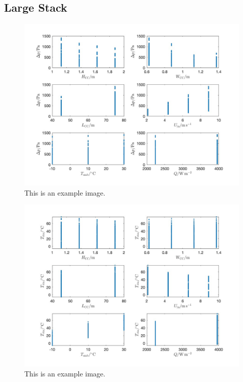     \subsection{Large Stack}
        \begin{figure}[H]
            \centering
            \includegraphics[width=1\textwidth]{00_Images/00_Large_Stack_Images/00_Pressure_Drop_vs_Features_July_10_2024_v1.jpg}  %
            \caption{This is an example image.}
            \label{fig:example1}
        \end{figure}

        \begin{figure}[H]
            \centering
            \includegraphics[width=1\textwidth]{00_Images/00_Large_Stack_Images/00_Temperature_vs_Features_July_10_2024_v1.jpg}  %
            \caption{This is an example image.}
            \label{fig:example1}
        \end{figure}

